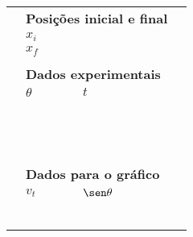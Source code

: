 \begin{table*}[!h]
\centering
\begin{tabular}{lp{25mm}p{25mm}l}
\toprule
	& \multicolumn{2}{l}{\textbf{Posições inicial e final}} \\
	\cmidrule{2-3}
	& $x_i$ \cellcolor[gray]{0.89} & \cellcolor[gray]{0.92} \\
	& $x_f$ \cellcolor[gray]{0.95} & \cellcolor[gray]{0.97} \\
	\cmidrule{2-3}
\\
	& \multicolumn{2}{l}{\textbf{Dados experimentais}} \\
	\cmidrule{2-3}
	& $\theta$ & $t$ & \\
	\cmidrule{2-3}
	& \cellcolor[gray]{0.89} & \cellcolor[gray]{0.92} \\
	& \cellcolor[gray]{0.95} & \cellcolor[gray]{0.97} \\
	& \cellcolor[gray]{0.89} & \cellcolor[gray]{0.92} \\
	& \cellcolor[gray]{0.95} & \cellcolor[gray]{0.97} \\
	& \cellcolor[gray]{0.89} & \cellcolor[gray]{0.92} \\
	& \cellcolor[gray]{0.95} & \cellcolor[gray]{0.97} \\
	& \cellcolor[gray]{0.89} & \cellcolor[gray]{0.92} \\
	& \cellcolor[gray]{0.95} & \cellcolor[gray]{0.97} \\
	& \cellcolor[gray]{0.89} & \cellcolor[gray]{0.92} \\
	& \cellcolor[gray]{0.95} & \cellcolor[gray]{0.97} \\
	& \cellcolor[gray]{0.89} & \cellcolor[gray]{0.92} \\
	& \cellcolor[gray]{0.95} & \cellcolor[gray]{0.97} \\
	\cmidrule{2-3}
\\
	& \multicolumn{2}{l}{\textbf{Dados para o gráfico}} \\
	\cmidrule{2-3}
	& $v_t$ & $\sen\theta$ \\
	\cmidrule{2-3}
	& \cellcolor[gray]{0.89} & \cellcolor[gray]{0.92} \\
	& \cellcolor[gray]{0.95} & \cellcolor[gray]{0.97} \\
	& \cellcolor[gray]{0.89} & \cellcolor[gray]{0.92} \\
	& \cellcolor[gray]{0.95} & \cellcolor[gray]{0.97} \\
	& \cellcolor[gray]{0.89} & \cellcolor[gray]{0.92} \\
	& \cellcolor[gray]{0.95} & \cellcolor[gray]{0.97} \\

\end{tabular}
\end{table*}
